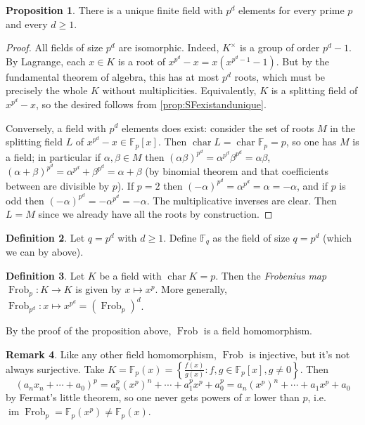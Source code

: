 \documentclass{article}
\newcommand{\F}{\mathbb{F}}
\newcommand{\Char}{\operatorname{char}}
\newcommand{\im}{\operatorname{im}}
\newcommand{\Frob}{\operatorname{Frob}}
\theoremstyle{definition}
\newtheorem{defn}{Definition}[subsection]
\newtheorem{prop}[defn]{Proposition}
\newtheorem{remark}[defn]{Remark}
\begin{document}
\begin{prop}
There is a unique finite field with $p^d$ elements for every prime $p$ and every $d\geq 1$.
\end{prop}
\begin{proof}
All fields of size $p^d$ are isomorphic. Indeed, $K^\times$ is a group of order $p^d-1$. By Lagrange, each $x\in K$ is a root of $x^{p^d}-x=x(x^{p^d-1}-1)$. But by the fundamental theorem of algebra, this has at most $p^d$ roots, which must be precisely the whole $K$ without multiplicities. Equivalently, $K$ is a splitting field of $x^{p^d}-x$, so the desired follows from \ref{prop:SFexistandunique}.

Conversely, a field with $p^d$ elements does exist: consider the set of roots $M$ in the splitting field $L$ of $x^{p^d}-x\in\F_p[x]$. Then $\Char L=\Char\F_p=p$, so one has $M$ is a field; in particular if $\alpha,\beta\in M$ then $(\alpha\beta)^{p^d}=\alpha^{p^d}\beta^{p^d}=\alpha\beta$, $(\alpha+\beta)^{p^d}=\alpha^{p^d}+\beta^{p^d}=\alpha+\beta$ (by binomial theorem and that coefficients between are divisible by $p$). If $p=2$ then $(-\alpha)^{p^d}=\alpha^{p^d}=\alpha=-\alpha$, and if $p$ is odd then $(-\alpha)^{p^d}=-\alpha^{p^d}=-\alpha$. The multiplicative inverses are clear. Then $L=M$ since we already have all the roots by construction.
\end{proof}

\begin{defn}
Let $q=p^d$ with $d\geq 1$. Define $\F_q$ as the field of size $q=p^d$ (which we can by above).
\end{defn}

\begin{defn}
Let $K$ be a field with $\Char K=p$. Then the \textit{Frobenius map} $\Frob_p:K\rightarrow K$ is given by $x\mapsto x^p$. More generally, $\Frob_{p^d}:x\mapsto x^{p^d}=(\Frob_p)^d$.

By the proof of the proposition above, $\Frob$ is a field homomorphism.
\end{defn}

\begin{remark}
Like any other field homomorphism, $\Frob$ is injective, but it's not always surjective. Take $K=\F_p(x)=\left\{\frac{f(x)}{g(x)}:f,g\in\F_p[x],g\neq 0\right\}$. Then
\[
\left(a_nx_n+\cdots+a_0\right)^p=a_n^p(x^p)^n+\cdots+a_1^px^p+a_0^p=a_n(x^p)^n+\cdots+a_1x^p+a_0
\]
by Fermat's little theorem, so one never gets powers of $x$ lower than $p$, i.e. $\im\Frob_p=\F_p(x^p)\neq \F_p(x)$.
\end{remark}
\end{document}

